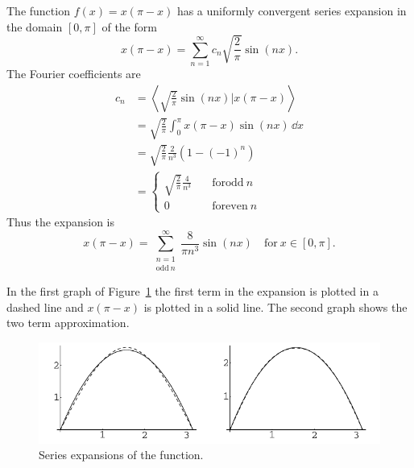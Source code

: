 \begin{Example}
  The function $f(x) = x(\pi - x)$ has a uniformly convergent series
  expansion in the domain $[0,\pi]$ of the form
  \[ x(\pi - x) = \sum_{n = 1}^\infty c_n \sqrt{\frac{2}{\pi}} \sin(n x).\]
  The Fourier coefficients are
  \begin{align*}
    c_n     &= \left\langle \sqrt{\frac{2}{\pi}} \sin(n x) \Bigg| x(\pi-x) \right\rangle \\
    &= \sqrt{\frac{2}{\pi}} \int_0^\pi x(\pi-x) \sin(n x)\,\dd x \\
    &= \sqrt{\frac{2}{\pi}} \frac{2}{n^3} (1 - (-1)^n) \\
    &= 
    \begin{cases}
      \sqrt{\frac{2}{\pi}} \frac{4}{n^3} \quad &\mathrm{for odd}\ n \\
      0 \quad &\mathrm{for even}\ n
    \end{cases}
  \end{align*}
  Thus the expansion is
  \[ x(\pi-x) = \sum_{\substack{ {n} = 1 \\ \mathrm{odd}\ n}}^{\infty} \frac{8}{\pi n^3} \sin(n x) \quad \mathrm{for}\ x \in [0, \pi]. \]

  In the first graph of Figure~\ref{sin_par} the first term in the expansion
  is plotted in a dashed line and $x (\pi - x)$ is plotted in a solid line.
  The second graph shows the two term approximation.

  \begin{figure}[h!]
    \begin{center}
      \includegraphics[width=\textwidth]{ode/hilbert/sin_par}
    \end{center}
    \caption{Series expansions of the function.}
    \label{sin_par}
  \end{figure}

\end{Example}












